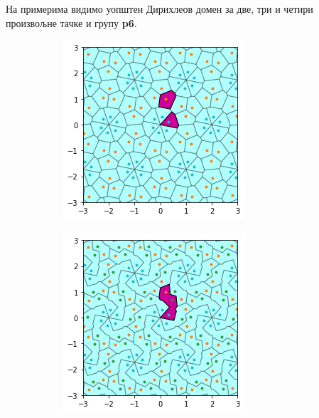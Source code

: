 \documentclass[12pt]{report}
\begin{document}


\begin{samepage}
На примерима видимо уопштен Дирихлеов домен за две, три и четири произвољне тачке и групу \textbf{p6}.

\begin{figure}[H]
  \begin{subfigure}[b]{0.3\textwidth}
    \includegraphics[width=\textwidth]{output_14_0.png}
    \label{fig:f4}
  \end{subfigure}
  \begin{subfigure}[b]{0.3\textwidth}
    \includegraphics[width=\textwidth]{output_15_0.png}

\end{subfigure}
\end{figure}
\end{samepage}
\end{document}
